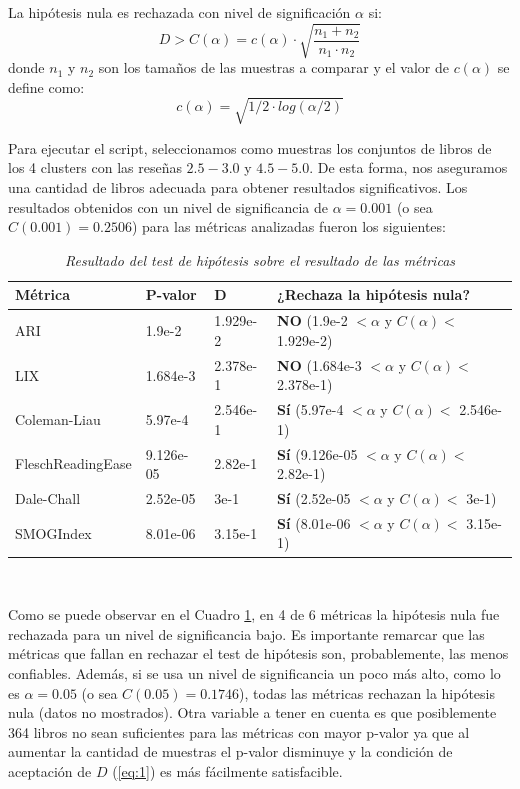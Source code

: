 \documentclass[12pt,journal,compsoc]{IEEEtran}
\begin{document}
La hipótesis nula es rechazada con nivel de significación $\alpha$ si:
\begin{equation} \label{eq:1}
D > C(\alpha) = c(\alpha) \cdot \sqrt{\frac{n_1+n_2}{n_1\cdot n_2}}
\end{equation}
donde $n_1$ y $n_2$ son los tamaños de las muestras a comparar y el valor de $c(\alpha)$ se define como:
$$c(\alpha) = \sqrt{1/2\cdot log(\alpha/2)}$$

Para ejecutar el script, seleccionamos como muestras los conjuntos de libros de los 4 clusters con las reseñas $2.5-3.0$ y $4.5-5.0$. De esta forma, nos aseguramos una cantidad de libros adecuada para obtener resultados significativos. Los resultados obtenidos con un nivel de significancia de $\alpha = 0.001$ (o sea $C(0.001) = 0.2506$) para las métricas analizadas fueron los siguientes:\\

\begin{table}[H]
\begin{center}
  \begin{tabular}{ | l | l | l | l | }
  \hline
  Métrica & P-valor & D & ¿Rechaza la hipótesis nula?\\
  \hline
  ARI & 1.9e-2 & 1.929e-2 & \textbf{NO} (1.9e-2 $< \alpha$ y $C(\alpha) <$ 1.929e-2)\\
  \hline
  LIX & 1.684e-3 & 2.378e-1 & \textbf{NO} (1.684e-3 $< \alpha$ y $C(\alpha) <$ 2.378e-1)\\
  \hline
  Coleman-Liau & 5.97e-4 & 2.546e-1 & \textbf{Sí} (5.97e-4 $< \alpha$ y $C(\alpha) <$ 2.546e-1)\\
  \hline
  FleschReadingEase & 9.126e-05 & 2.82e-1 & \textbf{Sí} (9.126e-05 $< \alpha$ y $C(\alpha) <$ 2.82e-1)\\
  \hline
  Dale-Chall & 2.52e-05 & 3e-1 & \textbf{Sí} (2.52e-05 $< \alpha$ y $C(\alpha) <$ 3e-1)\\
  \hline
  SMOGIndex & 8.01e-06 & 3.15e-1 & \textbf{Sí} (8.01e-06 $< \alpha$ y $C(\alpha) <$ 3.15e-1)\\
  \hline
  \end{tabular}
  \caption{\small \textit{Resultado del test de hipótesis sobre el resultado de las métricas}}
  \label{table:resultadoMetricas}
  \end{center}
  \end{table}


~

Como se puede observar en el Cuadro \ref{table:resultadoMetricas}, en 4 de 6 métricas la hipótesis nula fue rechazada para un nivel de significancia bajo. Es importante remarcar que las métricas que fallan en rechazar el test de hipótesis son, probablemente, las menos confiables. Además, si se usa un nivel de significancia un poco más alto, como lo es $\alpha = 0.05$ (o sea $C(0.05) = 0.1746$), todas las métricas rechazan la hipótesis nula (datos no mostrados). Otra variable a tener en cuenta es que posiblemente 364 libros no sean suficientes para las métricas con mayor p-valor ya que al aumentar la cantidad de muestras el p-valor disminuye y la condición de aceptación de $D$ (\ref{eq:1}) es más fácilmente satisfacible.
\end{document}
